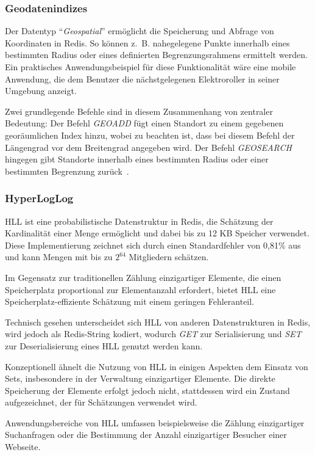 \subsubsection{Geodatenindizes}
Der Datentyp \enquote{\emph{Geospatial}} ermöglicht die Speicherung und Abfrage von Koordinaten in Redis. So können z.~B. nahegelegene Punkte innerhalb eines bestimmten Radius oder eines definierten Begrenzungsrahmens ermittelt werden.
Ein praktisches Anwendungsbeispiel für diese Funktionalität wäre eine mobile Anwendung, die dem Benutzer die nächstgelegenen Elektroroller in seiner Umgebung anzeigt.

Zwei grundlegende Befehle sind in diesem Zusammenhang von zentraler Bedeutung: Der Befehl \emph{GEOADD} fügt einen Standort zu einem gegebenen georäumlichen Index hinzu, wobei zu beachten ist, dass bei diesem Befehl der Längengrad vor dem Breitengrad angegeben wird. Der Befehl \emph{GEOSEARCH} hingegen gibt Standorte innerhalb eines bestimmten Radius oder einer bestimmten Begrenzung zurück~\cite{redis_ltd_geospatial_nodate}.





\subsubsection{HyperLogLog}
\ac{HLL} ist eine probabilistische Datenstruktur in Redis, die Schätzung der Kardinalität einer Menge ermöglicht und dabei bis zu 12 KB Speicher verwendet. Diese Implementierung zeichnet sich durch einen Standardfehler von 0,81\% aus und kann Mengen mit bis zu \(2^{64}\) Mitgliedern schätzen.

Im Gegensatz zur traditionellen Zählung einzigartiger Elemente, die einen Spei\-cher\-platz proportional zur Element\-an\-zahl erfordert, bietet \ac{HLL} eine Spei\-cher\-platz-ef\-fi\-zi\-en\-te Schätzung mit einem geringen Fehleranteil.

Technisch gesehen unterscheidet sich \ac{HLL} von anderen Datenstrukturen in Redis, wird jedoch als Redis-String kodiert, wodurch \emph{GET} zur Serialisierung und \emph{SET} zur Deserialisierung eines \ac{HLL} genutzt werden kann.

Konzeptionell ähnelt die Nutzung von \ac{HLL} in einigen Aspekten dem Einsatz von Sets, insbesondere in der Verwaltung einzigartiger Elemente. Die direkte Speicherung der Elemente erfolgt jedoch nicht, stattdessen wird ein Zustand aufgezeichnet, der für Schätzungen verwendet wird.

Anwendungsbereiche von \ac{HLL} umfassen beispielsweise die Zählung einzigartiger Such\-anfragen oder die Bestimmung der Anzahl einzigartiger Besucher einer Webseite.


